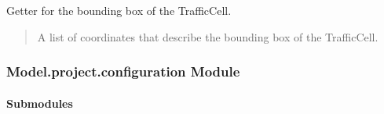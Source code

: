 \documentclass[letterpaper,10pt,english]{sphinxmanual}
\begin{document}
\begin{fulllineitems}
\begin{fulllineitems}
\begin{quote}
\begin{description}
\end{description}\end{quote}

\end{fulllineitems}


\begin{fulllineitems}
\label{\detokenize{apidoc/src.osm_configurator.model.project.calculation:src.osm_configurator.model.project.calculation.traffic_cell.TrafficCell.get_bounding_box}}
\pysigstartsignatures
{}
\pysigstopsignatures
\sphinxAtStartPar
Getter for the bounding box of the TrafficCell.
\begin{quote}\begin{description}
\sphinxAtStartPar
A list of coordinates that describe the bounding box of the TrafficCell.

\sphinxAtStartPar
{}

\end{description}\end{quote}

\end{fulllineitems}


\end{fulllineitems}


\subsubsection{Model.project.configuration Module}

\paragraph{Submodules}
\label{\detokenize{apidoc/src.osm_configurator.model.project.configuration:submodules}}
\end{document}
